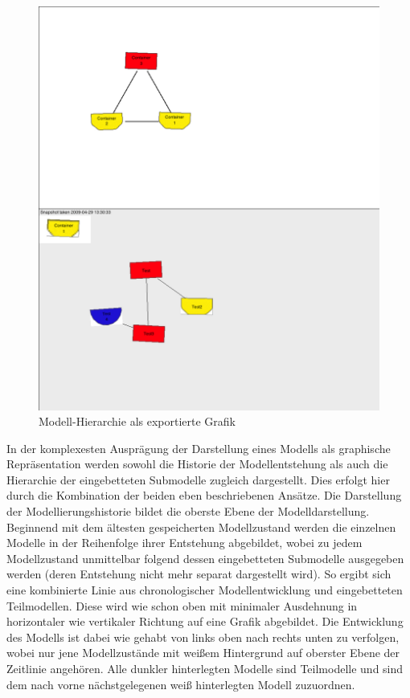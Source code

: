 \begin{figure}[htbp]
	\centering
		\includegraphics[width=\textwidth]{img/Persistenz/ExportHierarchie.png}
	\caption{Modell-Hierarchie als exportierte Grafik}
	\label{fig:img_Persistenz_ExportHierarchie}
\end{figure}

In der komplexesten Ausprägung der Darstellung eines Modells als graphische Repräsentation werden sowohl die Historie der Modellentstehung als auch die Hierarchie der eingebetteten Submodelle zugleich dargestellt. Dies erfolgt hier durch die Kombination der beiden eben beschriebenen Ansätze. Die Darstellung der Modellierungshistorie bildet die oberste Ebene der Modelldarstellung. Beginnend mit dem ältesten gespeicherten Modellzustand werden die einzelnen Modelle in der Reihenfolge ihrer Entstehung abgebildet, wobei zu jedem Modellzustand unmittelbar folgend dessen eingebetteten Submodelle ausgegeben werden (deren Entstehung nicht mehr separat dargestellt wird). So ergibt sich eine kombinierte Linie aus chronologischer Modellentwicklung und eingebetteten Teilmodellen. Diese wird wie schon oben mit minimaler Ausdehnung in horizontaler wie vertikaler Richtung auf eine Grafik abgebildet. Die Entwicklung des Modells ist dabei wie gehabt von links oben nach rechts unten zu verfolgen, wobei nur jene Modellzustände mit weißem Hintergrund auf oberster Ebene der Zeitlinie angehören. Alle dunkler hinterlegten Modelle sind Teilmodelle und sind dem nach vorne nächstgelegenen weiß hinterlegten Modell zuzuordnen.

